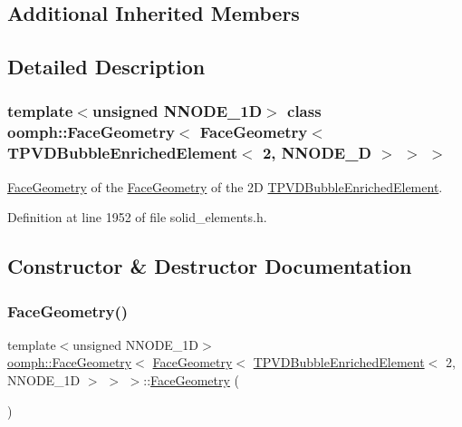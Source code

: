 \subsection*{Additional Inherited Members}


\subsection{Detailed Description}
\subsubsection*{template$<$unsigned N\+N\+O\+D\+E\+\_\+1D$>$\newline
class oomph\+::\+Face\+Geometry$<$ Face\+Geometry$<$ T\+P\+V\+D\+Bubble\+Enriched\+Element$<$ 2, N\+N\+O\+D\+E\+\_\+D $>$ $>$ $>$}

\hyperlink{classoomph_1_1FaceGeometry}{Face\+Geometry} of the \hyperlink{classoomph_1_1FaceGeometry}{Face\+Geometry} of the 2D \hyperlink{classoomph_1_1TPVDBubbleEnrichedElement}{T\+P\+V\+D\+Bubble\+Enriched\+Element}. 

Definition at line 1952 of file solid\+\_\+elements.\+h.



\subsection{Constructor \& Destructor Documentation}
\mbox{\label{classoomph_1_1FaceGeometry_3_01FaceGeometry_3_01TPVDBubbleEnrichedElement_3_012_00_01NNODE__1D_01_4_01_4_01_4_a7e110c7172c8a52d198c78f2f1a3f3bb}} 
\subsubsection{\texorpdfstring{Face\+Geometry()}{FaceGeometry()}}
{\footnotesize\ttfamily template$<$unsigned N\+N\+O\+D\+E\+\_\+1D$>$ \\
\hyperlink{classoomph_1_1FaceGeometry}{oomph\+::\+Face\+Geometry}$<$ \hyperlink{classoomph_1_1FaceGeometry}{Face\+Geometry}$<$ \hyperlink{classoomph_1_1TPVDBubbleEnrichedElement}{T\+P\+V\+D\+Bubble\+Enriched\+Element}$<$ 2, N\+N\+O\+D\+E\+\_\+1D $>$ $>$ $>$\+::\hyperlink{classoomph_1_1FaceGeometry}{Face\+Geometry} (\begin{DoxyParamCaption}{ }\end{DoxyParamCaption})\hspace{0.3cm}{\ttfamily [inline]}}



